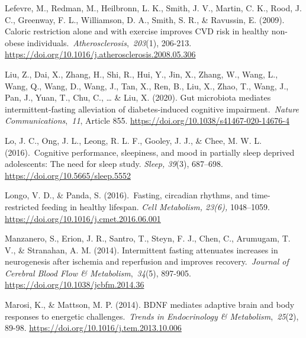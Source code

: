 \documentclass[authordate, empirical]{jote-new-article}
\begin{document}
Lefevre, M., Redman, M., Heilbronn, L. K., Smith, J. V., Martin, C. K., Rood, J. C., Greenway, F. L., Williamson, D. A., Smith, S. R., \& Ravussin, E. (2009). Caloric restriction alone and with exercise improves CVD risk in healthy non-obese individuals. \emph{Atherosclerosis}, \emph{203}(1), 206-213. \url{https://doi.org/10.1016/j.atherosclerosis.2008.05.306}



Liu, Z., Dai, X., Zhang, H., Shi, R., Hui, Y., Jin, X., Zhang, W., Wang, L., Wang, Q., Wang, D., Wang, J., Tan, X., Ren, B., Liu, X., Zhao, T., Wang, J., Pan, J., Yuan, T., Chu, C., … \& Liu, X. (2020). Gut microbiota mediates intermittent-fasting alleviation of diabetes-induced cognitive impairment. \emph{Nature Communications}, \emph{11}, Article 855. \url{https://doi.org/10.1038/s41467-020-14676-4}



Lo, J. C., Ong, J. L., Leong, R. L. F., Gooley, J. J., \& Chee, M. W. L. (2016). Cognitive performance, sleepiness, and mood in partially sleep deprived adolescents: The need for sleep study.\emph{ Sleep, 39}(3), 687--698. \url{https://doi.org/10.5665/sleep.5552}






Longo, V. D., \& Panda, S. (2016). Fasting, circadian rhythms, and time-restricted feeding in healthy lifespan.\emph{ Cell Metabolism, 23(6), }1048--1059. \url{https://doi.org/10.1016/j.cmet.2016.06.001}



Manzanero, S., Erion, J. R., Santro, T., Steyn, F. J., Chen, C., Arumugam, T. V., \& Stranahan, A. M. (2014). Intermittent fasting attenuates increases in neurogenesis after ischemia and reperfusion and improves recovery. \emph{Journal of Cerebral Blood Flow \& Metabolism}, \emph{34}(5), 897-905. \url{https://doi.org/10.1038/jcbfm.2014.36}



Marosi, K., \& Mattson, M. P. (2014). BDNF mediates adaptive brain and body responses to energetic challenges. \emph{Trends in Endocrinology \& Metabolism}, \emph{25}(2), 89-98. \url{https://doi.org/10.1016/j.tem.2013.10.006}



\end{document}
